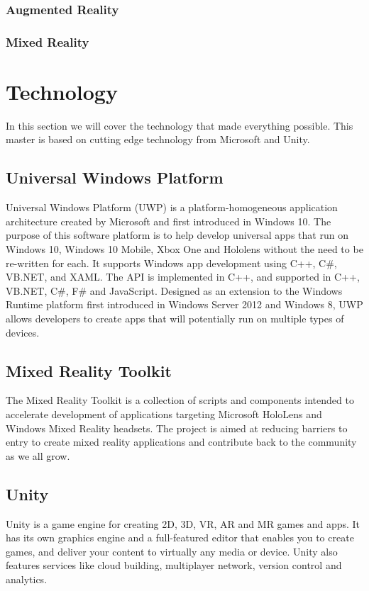     \subsubsection{Augmented Reality}
    \subsubsection{Mixed Reality}

\section{Technology}
In this section we will cover the technology that made everything possible. This master is based on cutting edge technology from Microsoft and Unity.

    \subsection{Universal Windows Platform}
    Universal Windows Platform (UWP) is a platform-homogeneous application architecture created by Microsoft and first introduced in Windows 10. The purpose of this software platform is to help develop universal apps that run on Windows 10, Windows 10 Mobile, Xbox One and Hololens without the need to be re-written for each. It supports Windows app development using C++, C\#, VB.NET, and XAML. The API is implemented in C++, and supported in C++, VB.NET, C\#, F\# and JavaScript. Designed as an extension to the Windows Runtime platform first introduced in Windows Server 2012 and Windows 8, UWP allows developers to create apps that will potentially run on multiple types of devices. %
    
    \subsection{Mixed Reality Toolkit}
    The Mixed Reality Toolkit is a collection of scripts and components intended to accelerate development of applications targeting Microsoft HoloLens and Windows Mixed Reality headsets. The project is aimed at reducing barriers to entry to create mixed reality applications and contribute back to the community as we all grow. %

    \subsection{Unity}
    Unity is a game engine for creating 2D, 3D, VR, AR and MR games and apps. It has its own graphics engine and a full-featured editor that enables you to create games, and deliver your content to virtually any media or device. Unity also features services like cloud building, multiplayer network, version control and analytics.


